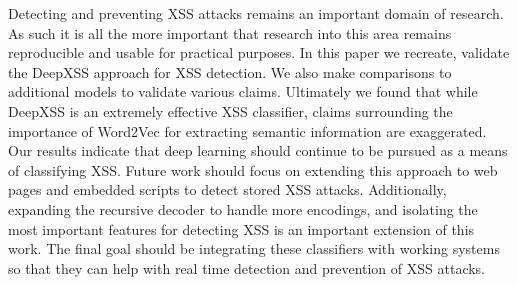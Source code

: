 Detecting and preventing XSS attacks remains an important domain of research. As such it is all the more important that research into this area remains reproducible and usable for practical purposes. In this paper we recreate, validate the DeepXSS approach for XSS detection. We also make comparisons to additional models to validate various claims. Ultimately we found that while DeepXSS is an extremely effective XSS classifier, claims surrounding the importance of Word2Vec for extracting semantic information are exaggerated. Our results indicate that deep learning should continue to be pursued as a means of classifying XSS. Future work should focus on extending this approach to web pages and embedded scripts to detect stored XSS attacks.  Additionally, expanding the recursive decoder to handle more encodings, and isolating the most important features for detecting XSS is an important extension of this work. The final goal should be integrating these classifiers with working systems so that they can help with real time detection and prevention of XSS attacks.
